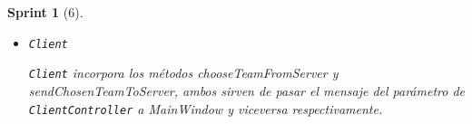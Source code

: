 \documentclass[12pt,a4paper,openright]{book}
\theoremstyle{break}
\newtheorem*{sprint}{Sprint}
\begin{document}
\begin{sprint}[6]
\begin{itemize}
Distingue, en su método run, de las notificaciones updateGraphics o chooseTeam; en función de eso, llama a updateGameFromServer o chooseTeamFromServer (de ClientRolit) respectivamente.

Además, incorpora los métodos sendChosenTeamToServer, sendPlayerInfoToServer, sendGameToServer, que se encargan de pasar el mensaje report del parámetro más un nuevo campo en el \texttt{JSON}, la notificación (chooseTeam, playerInfo, updateGraphics respectivamente).

\item \texttt{Client}

\texttt{Client} incorpora los métodos chooseTeamFromServer y sendChosenTeamToServer, ambos sirven de pasar el mensaje del parámetro de \texttt{ClientController} a MainWindow y viceversa respectivamente.

\end{itemize}

\end{sprint}
\end{document}
